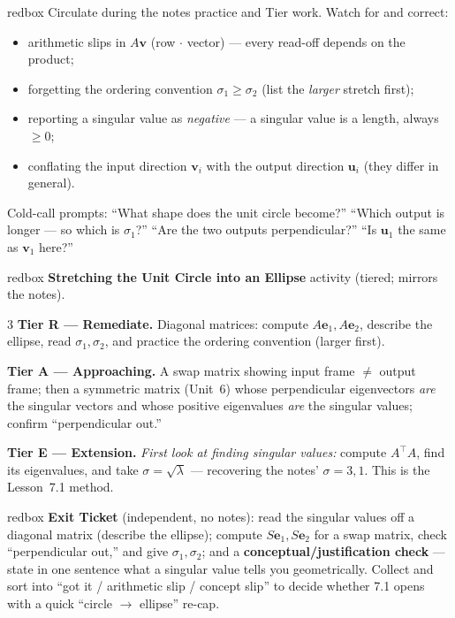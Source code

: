 \documentclass[10pt]{article}
\newcommand{\uu}{\mathbf{u}}
\newcommand{\vv}{\mathbf{v}}
\newcommand{\ee}{\mathbf{e}}
\newcommand{\T}{^{\top}}
\begin{document}
\begin{skillbox}{redbox}
Circulate during the notes practice and Tier work. Watch for and correct:
\begin{itemize}[leftmargin=1.2em, nosep]
  \item arithmetic slips in $A\vv$ (row $\cdot$ vector) --- every read-off depends on the product;
  \item forgetting the ordering convention $\sigma_1\ge\sigma_2$ (list the \emph{larger} stretch first);
  \item reporting a singular value as \emph{negative} --- a singular value is a length, always $\ge0$;
  \item conflating the input direction $\vv_i$ with the output direction $\uu_i$ (they differ in general).
\end{itemize}
Cold-call prompts: ``What shape does the unit circle become?'' ``Which output is longer --- so which is
$\sigma_1$?'' ``Are the two outputs perpendicular?'' ``Is $\uu_1$ the same as $\vv_1$ here?''
\end{skillbox}

\begin{skillbox}{redbox}
\textbf{Stretching the Unit Circle into an Ellipse} activity (tiered; mirrors the notes).
\begin{multicols}{3}
\textbf{Tier R --- Remediate.} Diagonal matrices: compute $A\ee_1,A\ee_2$, describe the ellipse, read
$\sigma_1,\sigma_2$, and practice the ordering convention (larger first).

\columnbreak
\textbf{Tier A --- Approaching.} A swap matrix showing input frame $\ne$ output frame; then a symmetric
matrix (Unit~6) whose perpendicular eigenvectors \emph{are} the singular vectors and whose positive
eigenvalues \emph{are} the singular values; confirm ``perpendicular out.''

\columnbreak
\textbf{Tier E --- Extension.} \emph{First look at finding singular values:} compute $A\T A$, find its
eigenvalues, and take $\sigma=\sqrt{\lambda}$ --- recovering the notes' $\sigma=3,1$. This is the
Lesson~7.1 method.
\end{multicols}
\end{skillbox}

\begin{skillbox}{redbox}
\textbf{Exit Ticket} (independent, no notes): read the singular values off a diagonal matrix (describe
the ellipse); compute $S\ee_1,S\ee_2$ for a swap matrix, check ``perpendicular out,'' and give
$\sigma_1,\sigma_2$; and a \textbf{conceptual/justification check} --- state in one sentence what a
singular value tells you geometrically. Collect and sort into ``got it / arithmetic slip / concept slip''
to decide whether 7.1 opens with a quick ``circle $\to$ ellipse'' re-cap.
\end{skillbox}
\end{document}
